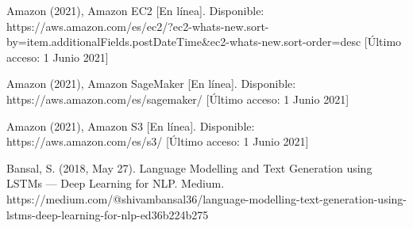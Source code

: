 \documentclass[12pt, a4paper, titlepage]{report}
\begin{document}
\begin{thebibliography}{20}
	Amazon (2021), Amazon EC2 [En línea]. Disponible: https://aws.amazon.com/es/ec2/?ec2-whats-new.sort-by=item.additionalFields.postDateTime\&ec2-whats-new.sort-order=desc [Último acceso: 1 Junio 2021]
	
	Amazon (2021), Amazon SageMaker [En línea]. Disponible: https://aws.amazon.com/es/sagemaker/ [Último acceso: 1 Junio 2021]
	
	Amazon (2021), Amazon S3 [En línea]. Disponible: https://aws.amazon.com/es/s3/ [Último acceso: 1 Junio 2021]
	
	Bansal, S. (2018, May 27). Language Modelling and Text Generation using LSTMs — Deep Learning for NLP. Medium. https://medium.com/@shivambansal36/language-modelling-text-generation-using-lstms-deep-learning-for-nlp-ed36b224b275
	
	
\end{thebibliography}	
\end{document}
